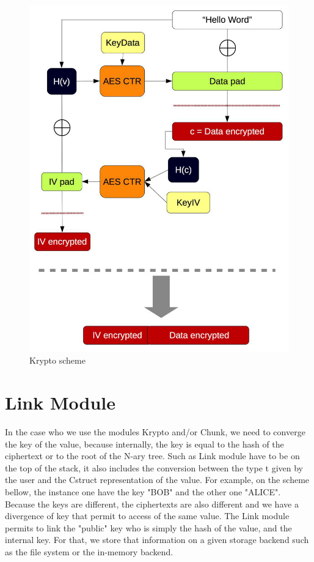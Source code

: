\documentclass[10pt,a4paper]{report}
\begin{document}
\begin{figure}[H]
\centerline{\includegraphics[scale=0.35]{img/krypto.jpg}}
\caption{Krypto scheme}
\end{figure}

\chapter{Link Module}
In the case who we use the modules Krypto and/or Chunk, we need to converge the key of the value, because internally, the key is equal to the hash of the ciphertext or to the root of the N-ary tree.
Such as Link module have to be on the top of the stack, it also includes the conversion between the type t given by the user and the Cstruct representation of the value. \newline
For example, on the scheme bellow, the instance one have the key "BOB" and the other one "ALICE". Because the keys are different, the ciphertexts are also different and we have a divergence of key that permit to access of the same value. \newline
The Link module permits to link the "public" key who is simply the hash of the value, and the internal key. For that, we store that information on a given storage backend such as the file system or the in-memory backend.\newline
\end{document}
